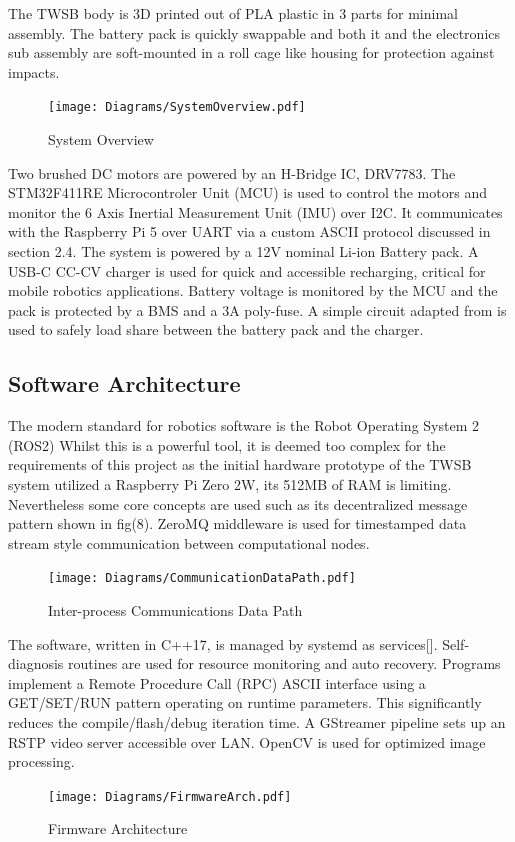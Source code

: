        The TWSB body is 3D printed out of PLA plastic in 3 parts for minimal assembly.
        The battery pack is quickly swappable and both it and the electronics sub assembly 
        are soft-mounted in a roll cage like housing for protection against impacts. 
        \begin{figure}[H]
            \centering
            \texttt{[image: Diagrams/SystemOverview.pdf]}
            \caption{System Overview}
        \end{figure}

        Two brushed DC motors are powered by an H-Bridge IC, DRV7783. 
        The STM32F411RE Microcontroler Unit (MCU) is used to control the 
        motors and monitor the 6 Axis Inertial Measurement Unit (IMU) over I2C. It communicates with the 
        Raspberry Pi 5 over UART via a custom ASCII protocol discussed in section 2.4. 
        The system is powered by a 12V nominal Li-ion Battery pack. A USB-C CC-CV charger is used for quick 
        and accessible recharging, critical for mobile robotics applications. 
        Battery voltage is monitored by the MCU and the pack is protected by a BMS and a 3A poly-fuse.
        A simple circuit adapted from \cite{chu2008designing} is used to safely load share between the battery pack and the charger.

        \subsection{Software Architecture}
        The modern standard for robotics software is the Robot Operating System 2 (ROS2) \cite{Macenski2022RobotOS}
        Whilst this is a powerful tool, it is deemed too complex for the requirements of this project
        as the initial hardware prototype of the TWSB system utilized a Raspberry Pi Zero 2W, 
        its 512MB of RAM is limiting. 
        Nevertheless some core concepts are used such as its 
        decentralized message pattern shown in fig(8). ZeroMQ middleware is used for 
        timestamped data stream style communication between computational nodes.
        \begin{figure} [H]
            \texttt{[image: Diagrams/CommunicationDataPath.pdf]}  
            \caption{Inter-process Communications Data Path}
        \end{figure}

        The software, written in C++17, is managed by systemd as services[]. 
        Self-diagnosis routines are used for resource monitoring and auto recovery. 
        Programs implement a Remote Procedure Call (RPC) ASCII interface using 
        a GET/SET/RUN pattern operating on runtime parameters. 
        This significantly reduces the compile/flash/debug iteration time. 
        A GStreamer pipeline sets up an RSTP video server accessible over LAN.
        OpenCV is used for optimized image processing.
        \begin{figure} [H]
            \texttt{[image: Diagrams/FirmwareArch.pdf]}
            \caption{Firmware Architecture}
        \end{figure}


